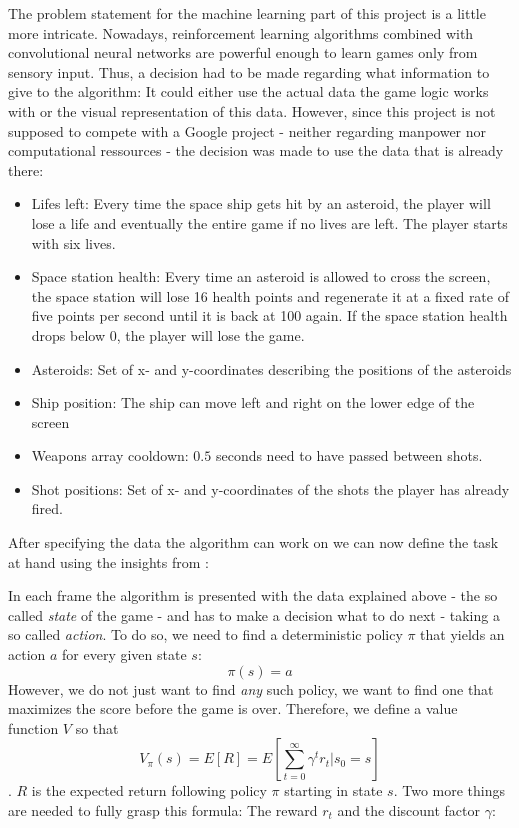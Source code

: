 \documentclass[a4paper,10pt]{article}
\begin{document}
The problem statement for the machine learning part of this project is a little more intricate.
Nowadays, reinforcement learning algorithms combined with convolutional neural networks are powerful enough to learn games only from sensory input\cite{DeepmindBreakout}.
Thus, a decision had to be made regarding what information to give to the algorithm:
It could either use the actual data the game logic works with or the visual representation of this data.
However, since this project is not supposed to compete with a Google project - neither regarding manpower nor computational ressources - the decision was made to use the data that is already there:

\begin{itemize}
 \item Lifes left: Every time the space ship gets hit by an asteroid, the player will lose a life and eventually the entire game if no lives are left. The player starts with six lives.
 \item Space station health: Every time an asteroid is allowed to cross the screen, the space station will lose 16 health points and regenerate it at a fixed rate of five points per second until it is back at 100 again. If the space station health drops below $0$, the player will lose the game.
 \item Asteroids: Set of x- and y-coordinates describing the positions of the asteroids
 \item Ship position: The ship can move left and right on the lower edge of the screen
 \item Weapons array cooldown: $0.5$ seconds need to have passed between shots.
 \item Shot positions: Set of x- and y-coordinates of the shots the player has already fired.
\end{itemize}

After specifying the data the algorithm can work on we can now define the task at hand using the insights from \cite{712192}:

In each frame the algorithm is presented with the data explained above - the so called \emph{state} of the game - and has to make a decision what to do next - taking a so called \emph{action}.
To do so, we need to find a deterministic policy $\pi$ that yields an action $a$ for every given state $s$:
\[\pi(s)=a\]
However, we do not just want to find \emph{any} such policy, we want to find one that maximizes the score before the game is over. 
Therefore, we define a value function $V$ so that
\[V_\pi(s) = E[R] = E[\sum_{t=0}^\infty\gamma^tr_t|s_0=s]\].
$R$ is the expected return following policy $\pi$ starting in state $s$.
Two more things are needed to fully grasp this formula: The reward $r_t$ and the discount factor $\gamma$:
\end{document}

